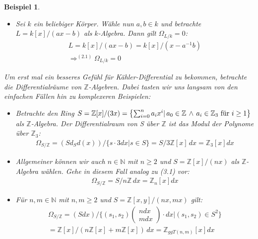 \documentclass[10pt,a4paper]{report}
\newcounter{Aussage}[chapter]
\newtheorem{bsp}[Aussage]{Beispiel}
\newcommand{\divR}[2]{\Omega_{#1/#2}}
\newcommand{\divf}[1]{d_{#1}}
\begin{document}
\begin{bsp}
\begin{itemize}
\item[(2.2)] Sei $k$ ein beliebiger Körper. Wähle nun $a,b \in k$ und betrachte\\
$L = k[x]/(ax - b)$ als $k$-Algebra. Dann gilt $\divR{L}{k} = 0$:
\begin{gather*}
L = k[x]/(ax - b) = k[x]/(x - a^{-1}b) \\
\Rightarrow^{(2.1)} \divR{L}{k} = 0
\end{gather*}
\end{itemize}
\begin{em}
Um erst mal ein besseres Gefühl für Kähler-Differential zu bekommen, betrachte die Differentialräume von $\mathbb{Z}$-Algebren. Dabei tasten wir uns langsam von den einfachen Fällen hin zu komplexeren Beispielen:
\end{em}
\begin{itemize}
\item[(3.1)] Betrachte den Ring $S = \mathbb{Z}[x]/(3x) = \nolinebreak{ \left\lbrace \sum_{i = 0}^n a_i x^i \vert \, a_0 \in \mathbb{Z} \, \wedge \, a_i \in \mathbb{Z}_3 \text{ für } i \geq 1 \right\rbrace}$ als $\mathbb{Z}$-Algebra. Der Differentialraum von S über $\mathbb{Z}$ ist das Modul der Polynome über $\mathbb{Z}_3$:
\begin{gather*}
\divR{S}{\mathbb{Z}} = \left( S\divf{S}d(x) \right)/\lbrace s \cdot 3dx \vert s \in S \rbrace = S/3\mathbb{Z}[x] \, dx = \mathbb{Z}_3[x] dx
\end{gather*}

\item[(3.2)] Allgemeiner können wir auch $n \in \mathbb{N}$ mit $n \geq 2$ und $S = \mathbb{Z}[x]/(nx)$ als $\mathbb{Z}$-Algebra wählen. Gehe in diesem Fall analog zu \textit{(3.1)} vor:
\begin{gather*}
\divR{S}{\mathbb{Z}} = S/n\mathbb{Z} \, dx = \mathbb{Z}_n[x] dx
\end{gather*}

\item[(3.3)] Für $n,m \in \mathbb{N}$ mit $n,m \geq 2$ und $S = \mathbb{Z}[x,y]/(nx,mx)$ gilt:
\begin{gather*}
\divR{S}{\mathbb{Z}}
= (S dx)/\lbrace (s_1,s_2)
\begin{pmatrix}
ndx\\
mdx
\end{pmatrix}
 \cdot dx \vert (s_1,s_2) \in S^2 \rbrace \\
= \mathbb{Z}[x]/ \left(n\mathbb{Z}[x] + m\mathbb{Z}[x]\right) \, dx 
= \mathbb{Z}_{ggT(n,m)}[x]dx
\end{gather*}


\end{itemize}
\end{bsp}
\end{document}
